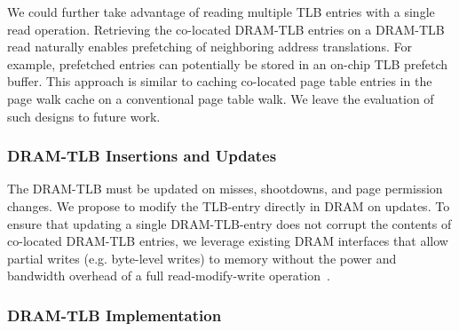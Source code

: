 We could further take advantage of reading multiple TLB entries with a
single read operation. Retrieving the co-located DRAM-TLB entries on a
DRAM-TLB read naturally enables prefetching of neighboring address
translations. For example, prefetched entries can potentially be
stored in an on-chip TLB prefetch buffer. This approach is similar to
caching co-located page table entries in the page walk cache on a
conventional page table walk. We leave the evaluation of such designs
to future work.



\subsubsection{DRAM-TLB Insertions and Updates}

\noindent The DRAM-TLB must be updated on misses, shootdowns, and page
permission changes. We propose to modify the TLB-entry directly in
DRAM on updates. To ensure that updating a single DRAM-TLB-entry does
not corrupt the contents of co-located DRAM-TLB entries, we leverage
existing DRAM interfaces that allow partial writes (e.g. byte-level
writes) to memory without the power and bandwidth overhead of a full
read-modify-write operation~\cite{hbm-spec}.






% 

\subsubsection{DRAM-TLB Implementation}

